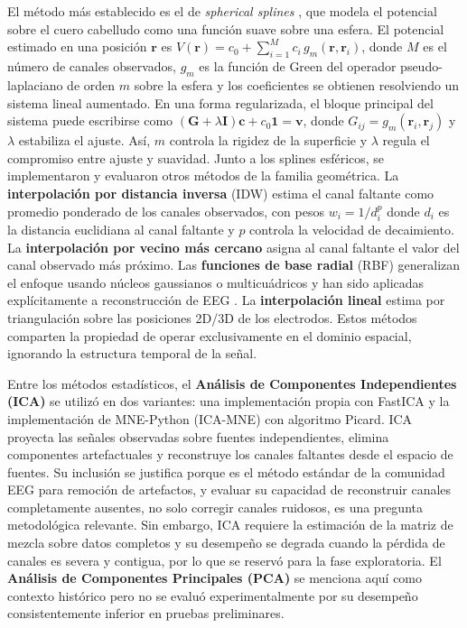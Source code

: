 El método más establecido es el de \textit{spherical splines} \cite{perrin1989}, que modela el potencial sobre el cuero cabelludo como una función suave sobre una esfera. El potencial estimado en una posición $\mathbf{r}$ es $\hat{V}(\mathbf{r}) = c_0 + \sum_{i=1}^{M} c_i \, g_m(\mathbf{r}, \mathbf{r}_i)$, donde $M$ es el número de canales observados, $g_m$ es la función de Green del operador pseudo-laplaciano de orden $m$ sobre la esfera y los coeficientes se obtienen resolviendo un sistema lineal aumentado. En una forma regularizada, el bloque principal del sistema puede escribirse como $(\mathbf{G} + \lambda \mathbf{I})\mathbf{c} + c_0\mathbf{1}=\mathbf{v}$, donde $G_{ij}=g_m(\mathbf{r}_i,\mathbf{r}_j)$ y $\lambda$ estabiliza el ajuste. Así, $m$ controla la rigidez de la superficie y $\lambda$ regula el compromiso entre ajuste y suavidad.
Junto a los splines esféricos, se implementaron y evaluaron otros métodos de la familia geométrica. La \textbf{interpolación por distancia inversa} (IDW) estima el canal faltante como promedio ponderado de los canales observados, con pesos $w_i = 1/d_i^p$ donde $d_i$ es la distancia euclidiana al canal faltante y $p$ controla la velocidad de decaimiento. La \textbf{interpolación por vecino más cercano} asigna al canal faltante el valor del canal observado más próximo. Las \textbf{funciones de base radial} (RBF) generalizan el enfoque usando núcleos gaussianos o multicuádricos y han sido aplicadas explícitamente a reconstrucción de EEG \cite{jager2016rbf}. La \textbf{interpolación lineal} estima por triangulación sobre las posiciones 2D/3D de los electrodos. Estos métodos comparten la propiedad de operar exclusivamente en el dominio espacial, ignorando la estructura temporal de la señal.

Entre los métodos estadísticos, el \textbf{Análisis de Componentes Independientes (ICA)} \cite{jung2001imaging} se utilizó en dos variantes: una implementación propia con FastICA y la implementación de MNE-Python (ICA-MNE) con algoritmo Picard. ICA proyecta las señales observadas sobre fuentes independientes, elimina componentes artefactuales y reconstruye los canales faltantes desde el espacio de fuentes. Su inclusión se justifica porque es el método estándar de la comunidad EEG para remoción de artefactos, y evaluar su capacidad de reconstruir canales completamente ausentes, no solo corregir canales ruidosos, es una pregunta metodológica relevante. Sin embargo, ICA requiere la estimación de la matriz de mezcla sobre datos completos y su desempeño se degrada cuando la pérdida de canales es severa y contigua, por lo que se reservó para la fase exploratoria. El \textbf{Análisis de Componentes Principales (PCA)} se menciona aquí como contexto histórico pero no se evaluó experimentalmente por su desempeño consistentemente inferior en pruebas preliminares.
